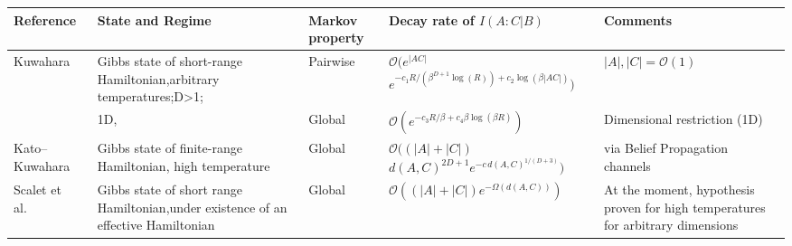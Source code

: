 \documentclass[11pt]{article}
\numberwithin{equation}{section}
\numberwithin{figure}{section}
\numberwithin{table}{section}
\theoremstyle{definition}
\theoremstyle{plain}
\theoremstyle{remark}
\newcommand{\abs}[1]{\left \vert#1\right\vert}
\begin{document}
\begin{table}[t!]
\centering
\setlength{\tabcolsep}{4pt}
\renewcommand{\arraystretch}{1.25}
\footnotesize
\begin{tabular}{|p{2.2cm}|p{3.2cm}|p{1.2cm}|p{4.5cm}|p{3cm}|}
\hline
\textbf{Reference} & \textbf{State and Regime} & \textbf{Markov property} &\textbf{Decay rate of $I(A:C|B)$}& \textbf{Comments} \\
\hline
\hline
Kuwahara~\cite{Kuw24}
&
Gibbs state of short-range Hamiltonian,\newline arbitrary temperatures;\newline D>1;\newline
&
Pairwise
&
$\mathcal{O}(e^{\abs{AC}}$\newline $e^{-c_1 R/(\beta^{D+1}\log(R))+c_2 \log(\beta \abs{AC})})$
&
$\abs{A},\abs{C}=\mathcal{O}(1)$
\\
&
1D,
&
Global
&
$\mathcal{O}(e^{-c_3 R/\beta+c_4 \beta \log(\beta R)})$
&
Dimensional restriction (1D)
\\
\hline
Kato--Kuwahara ~\cite{kato_clustering_2025}
&
Gibbs state of finite-range Hamiltonian, \newline high temperature
&
Global
&
$\mathcal{O}((\abs{A}+\abs{C})$\newline$d(A,C)^{2D+1}e^{-c \,d(A,C)^{1/(D+3)}})$
&
via Belief Propagation channels
\\
\hline
Scalet et al.~\cite{scalet2025classicalestimationfreeenergy}
&
Gibbs state of short range Hamiltonian,\newline under existence of an effective Hamiltonian
&
Global
&
$\mathcal{O}((\abs{A}+\abs{C})e^{-\Omega (d(A,C))})$
&
At the moment, hypothesis proven for high temperatures for arbitrary dimensions
\\


\end{tabular}
\end{table}
\end{document}

